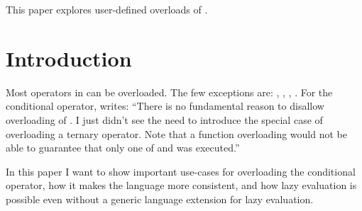 \newcommand\wgTitle{Making operator?: overloadable}
\newcommand\wgName{Matthias Kretz <m.kretz@gsi.de>}
\newcommand\wgDocumentNumber{D0917R4}
\newcommand\wgGroup{EWG}
\newcommand\wgTarget{\CC{}26}

\usepackage{mymacros}
\usepackage{wg21}
\usepackage{changelog}
\usepackage{underscore}



\newcommand\simd[1][]{\type{simd#1}\xspace}
\newcommand\simdT{\type{simd<T>}\xspace}
\newcommand\valuetype{\type{value\_type}\xspace}
\newcommand\referencetype{\type{reference}\xspace}
\newcommand\whereexpression{\type{where\_expression}\xspace}
\newcommand\simdcast{\code{simd\_cast}\xspace}
\newcommand\mask[1][]{\type{simd\_mask#1}\xspace}
\newcommand\maskT{\type{simd\_mask<T>}\xspace}
\newcommand\fixedsizeN{\type{simd\_abi::fixed\_size<N>}\xspace}
\newcommand\fixedsizescoped{\type{simd\_abi::fixed\_size}\xspace}
\newcommand\fixedsize{\type{fixed\_size}\xspace}
\newcommand\simdEP{\code{execution::}\type{simd}\xspace}
\newcommand\seqEP{\code{execution::}\type{seq}\xspace}


\begin{wgTitlepage}
  This paper explores user-defined overloads of .
\end{wgTitlepage}

\pagestyle{scrheadings}




\section{Introduction}
Most operators in \CC{} can be overloaded.
The few exceptions are: , \code{::}, , .
For the conditional operator, \textcite{StrFaq} writes:
“There is no fundamental reason to disallow overloading of .
I just didn't see the need to introduce the special case of overloading a ternary operator.
Note that a function overloading  would not be able to guarantee that only one of  and  was executed.”

In this paper I want to show important use-cases for overloading the conditional operator, how it makes the language more consistent, and how lazy evaluation is possible even without a generic language extension for lazy evaluation.


